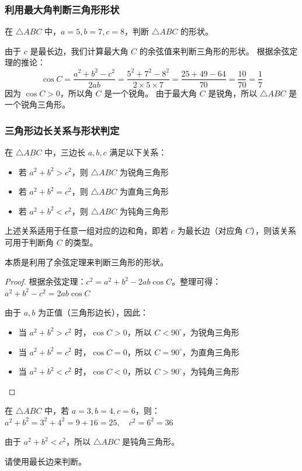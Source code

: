 \subsubsection{利用最大角判断三角形形状}

\begin{example}
    在 $\triangle ABC$ 中，$a=5, b=7, c=8$，判断 $\triangle ABC$ 的形状。
\end{example}
\begin{solution}
    由于 $c$ 是最长边，我们计算最大角 $C$ 的余弦值来判断三角形的形状。
    根据余弦定理的推论：
    $$
        \cos C = \frac{a^2 + b^2 - c^2}{2ab} = \frac{5^2 + 7^2 - 8^2}{2 \times 5 \times 7} = \frac{25 + 49 - 64}{70} = \frac{10}{70} = \frac{1}{7}
    $$
    因为 $\cos C > 0$，所以角 $C$ 是一个锐角。
    由于最大角 $C$ 是锐角，所以 $\triangle ABC$ 是一个锐角三角形。
\end{solution}

\vspace{2em}

\subsubsection{三角形边长关系与形状判定}

\begin{theorem}[三角形边长关系]
    在 $\triangle ABC$ 中，三边长 $a, b, c$ 满足以下关系：
    \begin{itemize}
        \item 若 $a^2+b^2>c^2$，则 $\triangle ABC$ 为锐角三角形
        \item 若 $a^2+b^2=c^2$，则 $\triangle ABC$ 为直角三角形
        \item 若 $a^2+b^2<c^2$，则 $\triangle ABC$ 为钝角三角形
    \end{itemize}
    上述关系适用于任意一组对应的边和角，即若 $c$ 为最长边（对应角 $C$），则该关系可用于判断角 $C$ 的类型。

    本质是利用了余弦定理来判断三角形的形状。
\end{theorem}

\begin{proof}
    根据余弦定理：$c^2 = a^2 + b^2 - 2ab\cos C$。整理可得：
    $a^2 + b^2 - c^2 = 2ab\cos C$

    由于 $a, b$ 为正值（三角形边长），因此：
    \begin{itemize}
        \item 当 $a^2+b^2>c^2$ 时，$\cos C > 0$，所以 $C < 90^\circ$，为锐角三角形
        \item 当 $a^2+b^2=c^2$ 时，$\cos C = 0$，所以 $C = 90^\circ$，为直角三角形
        \item 当 $a^2+b^2<c^2$ 时，$\cos C < 0$，所以 $C > 90^\circ$，为钝角三角形
    \end{itemize}
\end{proof}

\begin{example}
    在 $\triangle ABC$ 中，若 $a=3, b=4, c=6$，则：
    $a^2+b^2 = 3^2+4^2 = 9+16 = 25, \quad c^2 = 6^2 = 36$

    由于 $a^2+b^2 < c^2$，所以 $\triangle ABC$ 是钝角三角形。
\end{example}

\begin{tips}
    请使用最长边来判断。
\end{tips}
